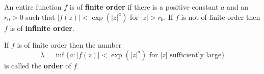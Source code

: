 An entire function $f$ is of \textbf{finite order} if there is a positive constant $a$ and an $r_0 > 0$ such that $|f(z)| < \exp(|z|^a)$ for $|z| > r_0$. If $f$ is not of finite order then $f$ is of \textbf{infinite order}.

If $f$ is of finite order then the number
$$\lambda = \inf\{a : |f(z)| < \exp(|z|^a) \text{ for } |z| \text{ sufficiently large}\}$$
is called the \textbf{order} of $f$.
